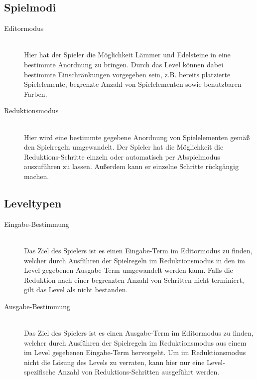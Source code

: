 \subsection{Spielmodi}

\begin{description}
\item[Editormodus] \hfill \\ Hier hat der Spieler die Möglichkeit Lämmer und Edelsteine in eine bestimmte Anordnung zu bringen. Durch das Level können dabei bestimmte Einschränkungen vorgegeben sein, z.B. bereits platzierte Spielelemente, begrenzte Anzahl von Spielelementen sowie benutzbaren Farben.
\item[Reduktionsmodus] \hfill \\ Hier wird eine bestimmte gegebene Anordnung von Spielelementen gemäß den Spielregeln umgewandelt. Der Spieler hat die Möglichkeit die Reduktions-Schritte einzeln oder automatisch per Abspielmodus auszuführen zu lassen. Außerdem kann er einzelne Schritte rückgängig machen.
\end{description}

\subsection{Leveltypen}

\begin{description}
\item[Eingabe-Bestimmung] \hfill \\ Das Ziel des Spielers ist es einen Eingabe-Term im Editormodus zu finden, welcher durch Ausführen  der Spielregeln im Reduktionsmodus in den im Level gegebenen Ausgabe-Term umgewandelt werden kann. Falls die Reduktion nach einer begrenzten Anzahl von Schritten nicht terminiert, gilt das Level als nicht bestanden.
\item[Ausgabe-Bestimmung] \hfill \\ Das Ziel des Spielers ist es einen Ausgabe-Term im Editormodus zu finden, welcher durch Ausführen  der Spielregeln im Reduktionsmodus aus einem im Level gegebenen Eingabe-Term hervorgeht. Um im Reduktionsmodus nicht die Lösung des Levels zu verraten, kann hier nur eine Level-spezifische Anzahl von Reduktions-Schritten ausgeführt werden.
\end{description}
